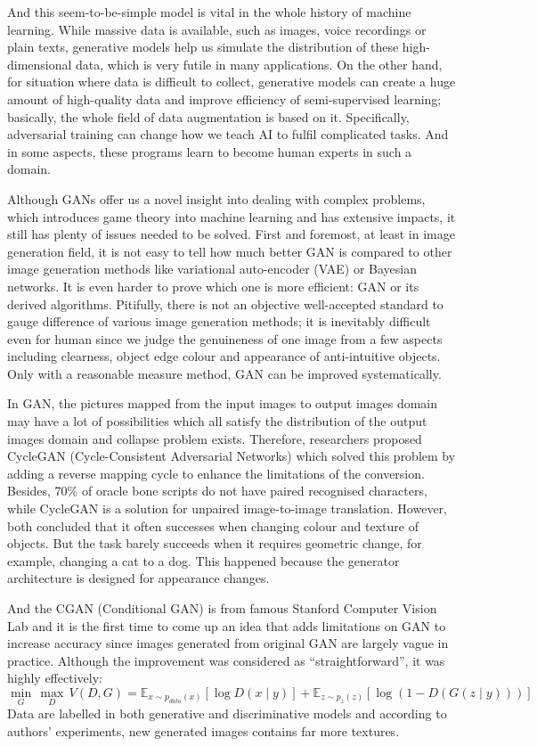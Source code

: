 And this seem-to-be-simple model is vital in the whole history of machine learning. While massive data is available, such as images, voice recordings or plain texts, generative models help us simulate the distribution of these high-dimensional data, which is very futile in many applications. On the other hand, for situation where data is difficult to collect, generative models can create a huge amount of high-quality data and improve efficiency of semi-supervised learning; basically, the whole field of data augmentation is based on it. Specifically, adversarial training can change how we teach AI to fulfil complicated tasks. And in some aspects, these programs learn to become human experts in such a domain.

Although GANs offer us a novel insight into dealing with complex problems, which introduces game theory into machine learning and has extensive impacts, it still has plenty of issues needed to be solved. First and foremost, at least in image generation field, it is not easy to tell how much better GAN is compared to other image generation methods like variational auto-encoder (VAE) or Bayesian networks. It is even harder to prove which one is more efficient: GAN or its derived algorithms. Pitifully, there is not an objective well-accepted standard to gauge difference of various image generation methods; it is inevitably difficult even for human since we judge the genuineness of one image from a few aspects including clearness, object edge colour and appearance of anti-intuitive objects. Only with a reasonable measure method, GAN can be improved systematically.

In GAN, the pictures mapped from the input images to output images domain may have a lot of possibilities which all satisfy the distribution of the output images domain and collapse problem exists. Therefore, researchers\cite{DBLP:journals/corr/ZhuPIE17} proposed CycleGAN (Cycle-Consistent Adversarial Networks) which solved this problem by adding a reverse mapping cycle to enhance the limitations of the conversion. Besides, 70\% of oracle bone scripts do not have paired recognised characters, while CycleGAN is a solution for unpaired image-to-image translation. However, both concluded that it often successes when changing colour and texture of objects. But the task barely succeeds when it requires geometric change, for example, changing a cat to a dog. This happened because the generator architecture is designed for appearance changes.

And the CGAN (Conditional GAN)\cite{DBLP:journals/corr/MirzaO14} is from famous Stanford Computer Vision Lab and it is the first time to come up an idea that adds limitations on GAN to increase accuracy since images generated from original GAN are largely vague in practice. Although the improvement was considered as ``straightforward'', it was highly effectively:
\[ \underset{G}{\min}\,{\underset{D}{\max}\,V(D, G)={\mathbb{E}_{x\sim{p_{data}(x)}}[\log{D(x \mid y)}]+\mathbb{E}_{z\sim{p_{z}(z)}}[\log{(1-D(G(z \mid y)))}]}} \]
Data are labelled in both generative and discriminative models and according to authors' experiments, new generated images contains far more textures.

